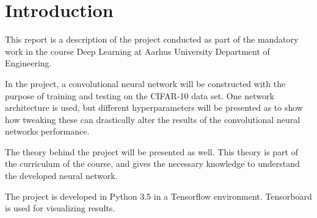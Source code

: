 \chapter{Introduction}
\label{chp:intro}

This report is a description of the project conducted as part of the mandatory work in the course Deep Learning at Aarhus University Department of Engineering.

In the project, a convolutional neural network will be constructed with the purpose of training and testing on the CIFAR-10 data set. One network architecture is used, but different hyperparameters will be presented as to show how tweaking these can drastically alter the results of the convolutional neural networks performance. 

The theory behind the project will be presented as well. This theory is part of the curriculum of the course, and gives the necessary knowledge to understand the developed neural network. 

The project is developed in Python 3.5 in a Tensorflow environment. Tensorboard is used for visualizing results. 